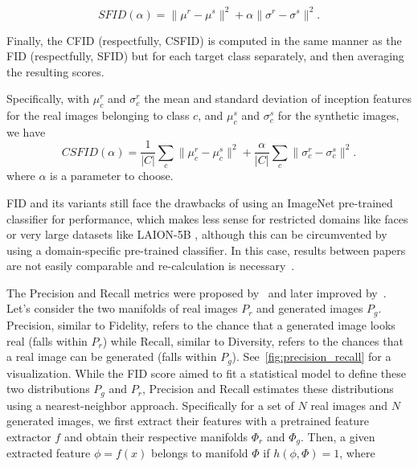 \begin{equation}
      SFID(\alpha) = \lVert \mu^r - \mu^s \rVert ^2 + \alpha \lVert\sigma^r - \sigma^s\rVert^2.
      \end{equation}
 
 Finally, the \ac{CFID} (respectfully, \ac{CSFID}) is computed in the same manner as the \ac{FID}
 (respectfully, \ac{SFID}) but for each target class separately, and then averaging the resulting scores.

 Specifically, with $\mu^r_c$ and $\sigma^r_c$ the mean and standard deviation of inception 
 features for the real images belonging to class $c$, and $\mu^s_c$ and $\sigma^s_c$ 
 for the synthetic images, we have
\begin{equation}
CSFID(\alpha) = \frac{1}{|C|} \sum_c \lVert \mu^r_c - \mu^s_c \rVert ^2 + \frac{\alpha}{|C|} \sum_c \lVert\sigma^r_c - \sigma^s_c\rVert^2.
\label{eq:sfid}
\end{equation}
where $\alpha$ is a parameter to choose. 
 
 


\ac{FID} and its variants
still face the drawbacks of using an ImageNet pre-trained classifier for performance, which 
 makes less sense for restricted domains like faces or very large datasets like LAION-5B \citep{schuhmann2022laion}, 
 although this can be circumvented by using 
a domain-specific pre-trained classifier. In this case, results between papers are not easily 
comparable and re-calculation is necessary~\citep{dhariwal2021diffusion}. 

  The Precision and Recall metrics were proposed by~\cite{sajjadi2018assessing} and 
later improved by~\cite{kynkaanniemi2019improved}. Let's consider the two manifolds of real images $P_r$ and 
generated images $P_g$.
Precision, similar to Fidelity, refers to the chance that a generated image looks real (falls within $P_r$) while 
Recall, similar to Diversity, refers to the chances that a real image can be generated (falls within $P_g$).
See~\ref{fig:precision_recall} for a visualization. While the \ac{FID} score aimed to fit a statistical model 
to define these two distributions $P_g$ and $P_r$, Precision and Recall estimates these distributions 
using a nearest-neighbor approach. Specifically for a set of $N$ real images
and $N$ generated images, we first extract their features with a pretrained
feature extractor $f$ and obtain their respective manifolds $\Phi_r$ and $\Phi_g$. 
Then, a given extracted feature $\phi = f(x)$ belongs to manifold $\Phi$ if $h(\phi, \Phi) = 1$, where 

